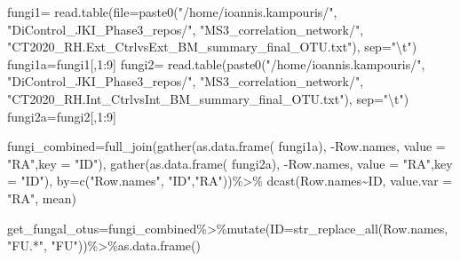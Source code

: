 \documentclass[
]{article}
\newenvironment{Shaded}{\begin{snugshade}}{\end{snugshade}}
\newcommand{\AttributeTok}[1]{\textcolor[rgb]{0.77,0.63,0.00}{#1}}
\newcommand{\DecValTok}[1]{\textcolor[rgb]{0.00,0.00,0.81}{#1}}
\newcommand{\FunctionTok}[1]{\textcolor[rgb]{0.00,0.00,0.00}{#1}}
\newcommand{\NormalTok}[1]{#1}
\newcommand{\OtherTok}[1]{\textcolor[rgb]{0.56,0.35,0.01}{#1}}
\newcommand{\SpecialCharTok}[1]{\textcolor[rgb]{0.00,0.00,0.00}{#1}}
\newcommand{\StringTok}[1]{\textcolor[rgb]{0.31,0.60,0.02}{#1}}
\begin{document}
\begin{Shaded}
\begin{Highlighting}[]
\NormalTok{fungi1}\OtherTok{=} \FunctionTok{read.table}\NormalTok{(}\AttributeTok{file=}\FunctionTok{paste0}\NormalTok{(}\StringTok{"/home/ioannis.kampouris/"}\NormalTok{,}
\StringTok{"DiControl\_JKI\_Phase3\_repos/"}\NormalTok{,}
\StringTok{"MS3\_correlation\_network/"}\NormalTok{,}
\StringTok{"CT2020\_RH.Ext\_CtrlvsExt\_BM\_summary\_final\_OTU.txt"}\NormalTok{), }\AttributeTok{sep=}\StringTok{"}\SpecialCharTok{\textbackslash{}t}\StringTok{"}\NormalTok{) }
\NormalTok{fungi1a}\OtherTok{=}\NormalTok{fungi1[,}\DecValTok{1}\SpecialCharTok{:}\DecValTok{9}\NormalTok{]}
\NormalTok{fungi2}\OtherTok{=} \FunctionTok{read.table}\NormalTok{(}\FunctionTok{paste0}\NormalTok{(}\StringTok{"/home/ioannis.kampouris/"}\NormalTok{,}
\StringTok{"DiControl\_JKI\_Phase3\_repos/"}\NormalTok{,}
\StringTok{"MS3\_correlation\_network/"}\NormalTok{,}
\StringTok{"CT2020\_RH.Int\_CtrlvsInt\_BM\_summary\_final\_OTU.txt"}\NormalTok{), }\AttributeTok{sep=}\StringTok{"}\SpecialCharTok{\textbackslash{}t}\StringTok{"}\NormalTok{)}
\NormalTok{fungi2a}\OtherTok{=}\NormalTok{fungi2[,}\DecValTok{1}\SpecialCharTok{:}\DecValTok{9}\NormalTok{]}

\NormalTok{fungi\_combined}\OtherTok{=}\FunctionTok{full\_join}\NormalTok{(}\FunctionTok{gather}\NormalTok{(}\FunctionTok{as.data.frame}\NormalTok{( fungi1a), }\SpecialCharTok{{-}}\NormalTok{Row.names, }\AttributeTok{value =} \StringTok{"RA"}\NormalTok{,}\AttributeTok{key =} \StringTok{"ID"}\NormalTok{),}
                         \FunctionTok{gather}\NormalTok{(}\FunctionTok{as.data.frame}\NormalTok{( fungi2a), }\SpecialCharTok{{-}}\NormalTok{Row.names, }\AttributeTok{value =} \StringTok{"RA"}\NormalTok{,}\AttributeTok{key =} \StringTok{"ID"}\NormalTok{), }\AttributeTok{by=}\FunctionTok{c}\NormalTok{(}\StringTok{"Row.names"}\NormalTok{, }\StringTok{"ID"}\NormalTok{,}\StringTok{"RA"}\NormalTok{))}\SpecialCharTok{\%\textgreater{}\%}
    \FunctionTok{dcast}\NormalTok{(}\StringTok{\textasciigrave{}}\AttributeTok{Row.names}\StringTok{\textasciigrave{}}\SpecialCharTok{\textasciitilde{}}\NormalTok{ID, }\AttributeTok{value.var =} \StringTok{"RA"}\NormalTok{, mean)}
 

\NormalTok{get\_fungal\_otus}\OtherTok{=}\NormalTok{fungi\_combined}\SpecialCharTok{\%\textgreater{}\%}\FunctionTok{mutate}\NormalTok{(}\AttributeTok{ID=}\FunctionTok{str\_replace\_all}\NormalTok{(}\StringTok{\textasciigrave{}}\AttributeTok{Row.names}\StringTok{\textasciigrave{}}\NormalTok{, }\StringTok{"FU.*"}\NormalTok{, }\StringTok{"FU"}\NormalTok{))}\SpecialCharTok{\%\textgreater{}\%}\FunctionTok{as.data.frame}\NormalTok{()}


\end{Highlighting}
\end{Shaded}
\end{document}
